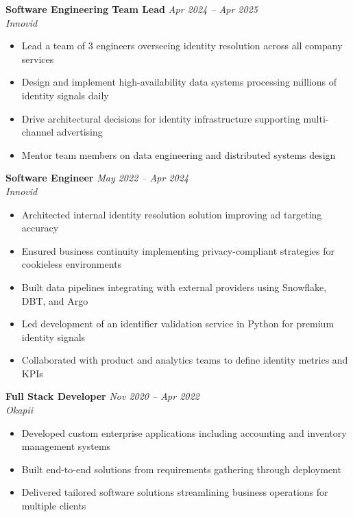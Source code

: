 \documentclass[10pt,a4paper]{article}
\newcommand{\cventry}[3]{%
  \textbf{#1} \hfill \textit{#3}\\[3pt]
  \textit{#2}%
}
\begin{document}
\vspace{0.25cm}

\cventry{Software Engineering Team Lead}{Innovid}{Apr 2024 -- Apr 2025}
\begin{itemize}[leftmargin=*, noitemsep, topsep=3pt, itemsep=2pt]
  \item Lead a team of 3 engineers overseeing identity resolution
        across all company services
  \item Design and implement high-availability data systems processing
        millions of identity signals daily
  \item Drive architectural decisions for identity infrastructure
        supporting multi-channel advertising
  \item Mentor team members on data engineering and distributed
        systems design
\end{itemize}

\vspace{0.25cm}

\cventry{Software Engineer}{Innovid}{May 2022 -- Apr 2024}
\begin{itemize}[leftmargin=*, noitemsep, topsep=3pt, itemsep=2pt]
  \item Architected internal identity resolution solution improving
        ad targeting accuracy
  \item Ensured business continuity implementing privacy-compliant
        strategies for cookieless environments
  \item Built data pipelines integrating with external providers
        using Snowflake, DBT, and Argo
  \item Led development of an identifier validation service in Python
        for premium identity signals
  \item Collaborated with product and analytics teams to define
        identity metrics and KPIs
\end{itemize}

\vspace{0.25cm}

\cventry{Full Stack Developer}{Okapii}{Nov 2020 -- Apr 2022}
\begin{itemize}[leftmargin=*, noitemsep, topsep=3pt, itemsep=2pt]
  \item Developed custom enterprise applications including accounting
        and inventory management systems
  \item Built end-to-end solutions from requirements gathering through
        deployment
  \item Delivered tailored software solutions streamlining business
        operations for multiple clients
\end{itemize}
\end{document}
